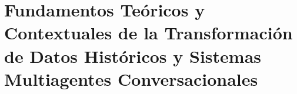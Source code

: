 \chapter{Fundamentos Teóricos y Contextuales de la Transformación de Datos Históricos y Sistemas Multiagentes Conversacionales}
\label{chap:chapter1}

